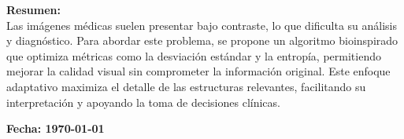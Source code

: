 \begin{titlepage}
\begin{center}
\begin{minipage}{0.8\textwidth}
        \end{minipage}

        \begin{minipage}{0.8\textwidth}
            \textbf{Resumen:}\\[0.3cm]
            Las imágenes médicas suelen presentar bajo contraste, lo que dificulta su análisis y diagnóstico. Para abordar este problema, se propone un algoritmo bioinspirado que optimiza métricas como la desviación estándar y la entropía, permitiendo mejorar la calidad visual sin comprometer la información original. Este enfoque adaptativo maximiza el detalle de las estructuras relevantes, facilitando su interpretación y apoyando la toma de decisiones clínicas.
        \end{minipage}

        \vspace{0.3cm}

        \textbf{\large Fecha: \today}

    \end{center}
\end{titlepage}
